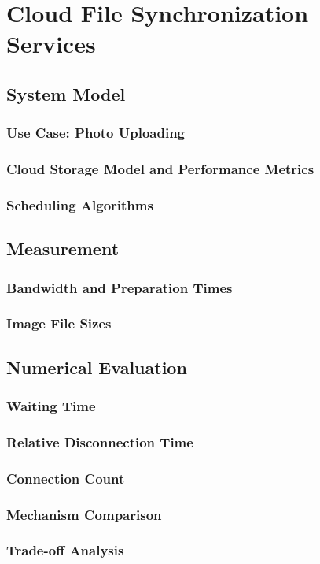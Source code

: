 \section{Cloud File Synchronization Services}
\cite{Schwartz2014a}

\subsection{System Model}
\subsubsection*{Use Case: Photo Uploading}
\subsubsection*{Cloud Storage Model and Performance Metrics}
\subsubsection*{Scheduling Algorithms}

\subsection{Measurement}
\subsubsection*{Bandwidth and Preparation Times}
\subsubsection*{Image File Sizes}

\subsection{Numerical Evaluation}
\subsubsection*{Waiting Time}
\subsubsection*{Relative Disconnection Time}
\subsubsection*{Connection Count}
\subsubsection*{Mechanism Comparison}
\subsubsection*{Trade-off Analysis}